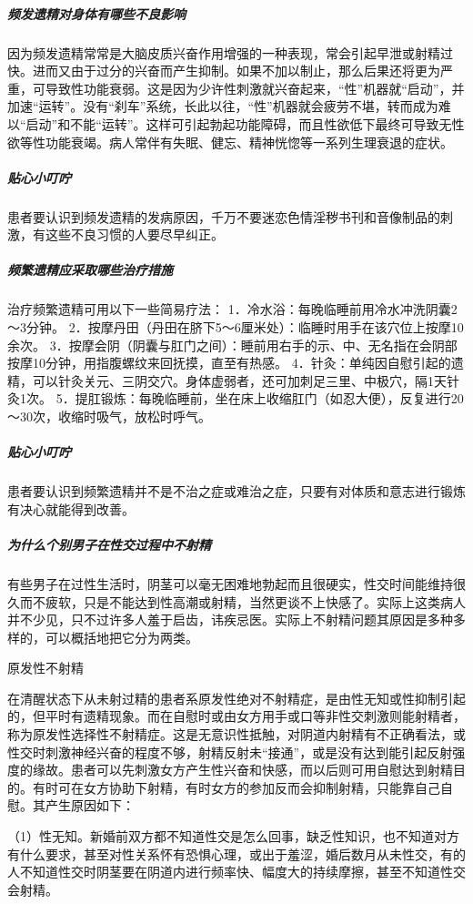 \subparagraph{频发遗精对身体有哪些不良影响}

因为频发遗精常常是大脑皮质兴奋作用增强的一种表现，常会引起早泄或射精过快。进而又由于过分的兴奋而产生抑制。如果不加以制止，那么后果还将更为严重，可导致性功能衰弱。这是因为少许性刺激就兴奋起来，“性”机器就“启动”，并加速“运转”。没有“刹车”系统，长此以往，“性”机器就会疲劳不堪，转而成为难以“启动”和不能“运转”。这样可引起勃起功能障碍，而且性欲低下最终可导致无性欲等性功能衰竭。病人常伴有失眠、健忘、精神恍惚等一系列生理衰退的症状。

\subparagraph{贴心小叮咛}

患者要认识到频发遗精的发病原因，千万不要迷恋色情淫秽书刊和音像制品的刺激，有这些不良习惯的人要尽早纠正。

\subparagraph{频繁遗精应采取哪些治疗措施}

治疗频繁遗精可用以下一些简易疗法：
1．冷水浴：每晚临睡前用冷水冲洗阴囊2～3分钟。
2．按摩丹田（丹田在脐下5～6厘米处）：临睡时用手在该穴位上按摩10余次。
3．按摩会阴（阴囊与肛门之间）：睡前用右手的示、中、无名指在会阴部按摩10分钟，用指腹螺纹来回抚摸，直至有热感。
4．针灸：单纯因自慰引起的遗精，可以针灸关元、三阴交穴。身体虚弱者，还可加刺足三里、中极穴，隔1天针灸1次。
5．提肛锻炼：每晚临睡前，坐在床上收缩肛门（如忍大便），反复进行20～30次，收缩时吸气，放松时呼气。

\subparagraph{贴心小叮咛}

患者要认识到频繁遗精并不是不治之症或难治之症，只要有对体质和意志进行锻炼有决心就能得到改善。

\subparagraph{为什么个别男子在性交过程中不射精}

有些男子在过性生活时，阴茎可以毫无困难地勃起而且很硬实，性交时间能维持很久而不疲软，只是不能达到性高潮或射精，当然更谈不上快感了。实际上这类病人并不少见，只不过许多人羞于启齿，讳疾忌医。实际上不射精问题其原因是多种多样的，可以概括地把它分为两类。

原发性不射精

在清醒状态下从未射过精的患者系原发性绝对不射精症，是由性无知或性抑制引起的，但平时有遗精现象。而在自慰时或由女方用手或口等非性交刺激则能射精者，称为原发性选择性不射精症。这是无意识性抵触，对阴道内射精有不正确看法，或性交时刺激神经兴奋的程度不够，射精反射未“接通”，或是没有达到能引起反射强度的缘故。患者可以先刺激女方产生性兴奋和快感，而以后则可用自慰达到射精目的。有时可在女方协助下射精，有时女方的参加反而会抑制射精，只能靠自己自慰。其产生原因如下：

（1）性无知。新婚前双方都不知道性交是怎么回事，缺乏性知识，也不知道对方有什么要求，甚至对性关系怀有恐惧心理，或出于羞涩，婚后数月从未性交，有的人不知道性交时阴茎要在阴道内进行频率快、幅度大的持续摩擦，甚至不知道性交会射精。

